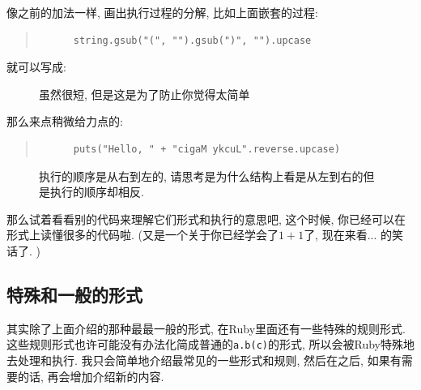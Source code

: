 \begin{example}
  像之前的加法一样, 画出执行过程的分解, 比如上面嵌套的过程: 

  \begin{quotation}
    \begin{verbatim}
      string.gsub("(", "").gsub(")", "").upcase
    \end{verbatim}
  \end{quotation}

  就可以写成: 

  \begin{figure}[h]
    \centering
    \caption{虽然很短, 但是这是为了防止你觉得太简单}
  \end{figure}

  那么来点稍微给力点的: 

  \begin{quotation}
    \begin{verbatim}
      puts("Hello, " + "cigaM ykcuL".reverse.upcase)
    \end{verbatim}
  \end{quotation}

  \begin{figure}[h]
    \centering
    \caption{执行的顺序是从右到左的, 请思考是为什么结构上看是从左到右的但是执行的顺序却相反. }
  \end{figure}

  那么试着看看别的代码来理解它们形式和执行的意思吧, 这个时候, 你已经可以在形式上读懂很多的代码啦. (又是一个关于你已经学会了$1+1$了, 现在来看... 的笑话了. )
\end{example}

\subsection{特殊和一般的形式}
其实除了上面介绍的那种最最一般的形式, 在Ruby里面还有一些特殊的规则形式. 这些规则形式也许可能没有办法化简成普通的\texttt{a.b(c)}的形式, 所以会被Ruby特殊地去处理和执行. 我只会简单地介绍最常见的一些形式和规则, 然后在之后, 如果有需要的话, 再会增加介绍新的内容. 

